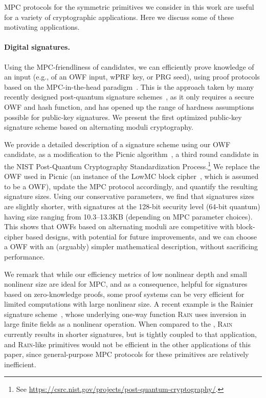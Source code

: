 MPC protocols for the symmetric primitives we consider in this work are useful for a variety of cryptographic applications. Here we discuss some of these motivating applications.

\paragraph{Digital signatures.} Using the MPC-friendliness of candidates, we can efficiently prove knowledge of
an input (e.g., of an OWF input, wPRF key, or PRG seed), using proof protocols
based on the MPC-in-the-head paradigm~\cite{ishai2007-zkmpc}.  This is the approach
taken by many recently designed post-quantum signature
schemes~\cite{chase2017-picnic,CCS:KatKolWan18,beullens2020-sigma-mq,beullens2020-legroast,guilhem2019-bbq,banquet},
as it only requires a secure OWF and hash function, and has opened up the range
of hardness assumptions possible for public-key signatures.  We present the
first optimized public-key signature scheme based on alternating moduli cryptography.

We provide a detailed description of a signature scheme using our OWF candidate,
as a modification to the Picnic
algorithm~\cite{chase2017-picnic,CCS:KatKolWan18,kales2020-picnic,picnic-spec}, a
third round candidate in the NIST Post-Quantum Cryptography Standardization
Process.\footnote{See
\url{https://csrc.nist.gov/projects/post-quantum-cryptography/}.} We replace
the OWF used in Picnic (an instance of the LowMC block cipher~\cite{albrecht2015-lowmc}, which is assumed to be a OWF),
update the MPC protocol accordingly, and quantify the resulting signature
sizes.  Using our conservative \ttOWF parameters, we find that signatures sizes are slightly shorter, with signatures at
the 128-bit security level (64-bit quantum) having size ranging from 10.3--13.3KB (depending
on MPC parameter choices).  This
shows that OWFs based on alternating moduli are competitive with block-cipher
based designs, with potential for future improvements, and we can choose a OWF with an (arguably) simpler mathematical
description, without sacrificing performance.

\iffull
We remark that while our efficiency metrics of low nonlinear depth and small
nonlinear size are ideal for MPC, and as a consequence, helpful for signatures
based on zero-knowledge proofs, some proof systems can be very efficient for
limited computations with large nonlinear size.  A recent example is the
Rainier signature scheme~\cite{dobraunig2021-rainier}, whose underlying one-way
function \textsc{Rain} uses inversion in large finite fields as a nonlinear
operation. When compared to the \ttOWF, \textsc{Rain} currently results in
shorter signatures, but is tightly coupled to that application, and
\textsc{Rain}-like primitives would not be efficient in the other applications
of this paper, since general-purpose MPC protocols for these primitives are
relatively inefficient.
\fi

